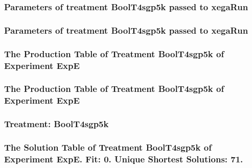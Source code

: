 \documentclass[18pt,c]{beamer}
\begin{document}

 \begin{frame}
 \fontsize{8pt}{9pt}\selectfont
 \frametitle{  Parameters of treatment BoolT4sgp5k passed to xegaRun
 }

 \label{ExpEtParmTable014.tex}  
 \end{frame}


 \begin{frame}
 \fontsize{8pt}{9pt}\selectfont
 \frametitle{  Parameters of treatment BoolT4sgp5k passed to xegaRun
 }

 \label{ExpEtParmTable015.tex}  
 \end{frame}

 \begin{frame}
 \fontsize{8pt}{9pt}\selectfont
 \frametitle{ The Production Table of Treatment BoolT4sgp5k of Experiment ExpE }

 \label{ExpEGrammarTable004.tex}  
 \end{frame}

 \begin{frame}
 \fontsize{8pt}{9pt}\selectfont
 \frametitle{ The Production Table of Treatment BoolT4sgp5k of Experiment ExpE }

 \label{ExpEGrammarTable005.tex}  
 \end{frame}

 \begin{frame}
 \fontsize{8pt}{9pt}\selectfont
 \frametitle{ Treatment: BoolT4sgp5k }

 \label{ExpEStatsTable006.tex}  
 \end{frame}

 \begin{frame}
 \fontsize{8pt}{9pt}\selectfont
 \frametitle{ The Solution Table of Treatment BoolT4sgp5k of Experiment ExpE. Fit: 0. Unique Shortest Solutions: 71. }

 \label{ExpESolutionTable003.tex}  
 \end{frame}
\end{document}
